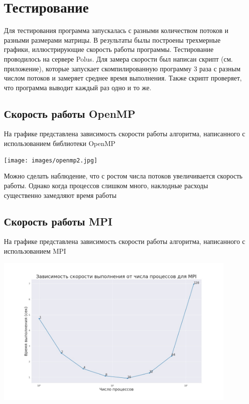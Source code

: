 \documentclass[./import.tex]{subfiles}
\begin{document}
\section{Тестирование}
Для тестирования программа запускалась с разными количеством потоков и разными размерами матрицы. 
В результаты былы построены трехмерные графики, иллюстрирующие скорость работы программы. 
Тестирование проводилось на сервере Polus.
Для замера скорости был написан скрипт (см. приложение), которые запускает скомпилированную программу 3 раза с разным числом потоков и замеряет среднее время выполнения. Также скрипт проверяет, что программа выводит каждый раз одно и то же.

\subsection{Скорость работы OpenMP}
На графике представлена зависимость скорости работы алгоритма, написанного с использованием библиотеки OpenMP
\begin{center}
  \texttt{[image: images/openmp2.jpg]}
\end{center}

Можно сделать наблюдение, что с ростом числа потоков увеличивается скорость работы. Однако когда процессов слишком много, наклодные расходы существенно замедляют время работы

\subsection{Скорость работы MPI}
На графике представлена зависимость скорости работы алгоритма, написанного с использованием MPI
\begin{center}
  \includegraphics[width=0.9\textwidth]{images/mpi.jpg}
\end{center}
\end{document}
